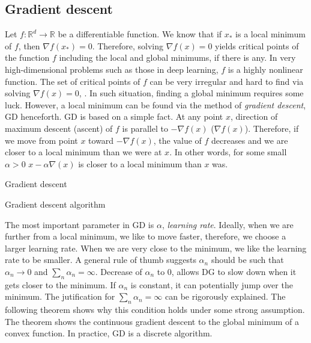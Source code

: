 \documentclass[11pt]{book}
\begin{document}
\subsection{Gradient descent}
Let $f:\mathbb{R}^d\to\mathbb{R}$ be a differentiable function. We know that if $x_*$ is a local minimum of $f$, then $\nabla f(x_*)=0$. Therefore, solving $\nabla f(x)=0$ yields critical points of the function $f$ including the local and global minimums, if there is any. In very high-dimensional problems such as those in deep learning, $f$ is a highly nonlinear function. The set of critical points of $f$ can be very irregular and hard to find via solving $\nabla f(x)=0$, \citet{PRV21}. In such situation, finding a global minimum requires some luck. However, a local minimum can be found via the method of \emph{gradient descent}, GD henceforth. 
GD is based on a simple fact. At any point $x$, direction of maximum descent (ascent) of $f$ is parallel to $-\nabla f(x)$ ($\nabla f(x)$). Therefore, if we move from point $x$ toward $-\nabla f(x)$, the value of $f$ decreases and we are closer to a local minimum than we were at $x$. In other words, for some small $\alpha>0$ $x-\alpha\nabla(x)$ is closer to a local minimum than $x$ was. 
\begin{algorithm}
        \caption{Gradient descent}
        \label{alg:gd}
        \caption{Gradient descent algorithm}
\end{algorithm}
The most important parameter in GD is $\alpha$, \emph{learning rate}. Ideally, when we are further from a local minimum, we like to move faster, therefore, we choose a larger learning rate. When we are very close to the minimum, we like the learning rate to be smaller. A general rule of thumb suggests $\alpha_n$ should be such that $\alpha_n\to0$ and $\sum_n\alpha_n=\infty$. Decrease of $\alpha_n$ to 0, allows DG to slow down when it gets closer to the minimum. If $\alpha_n$ is constant, it can potentially jump over the minimum. The jutification for $\sum_n\alpha_n=\infty$ can be rigorously explained. The following theorem shows why this condition holds under some strong assumption. The theorem shows the continuous gradient descent to the global minimum of a convex function. In practice, GD is a discrete algorithm. 
\end{document}
